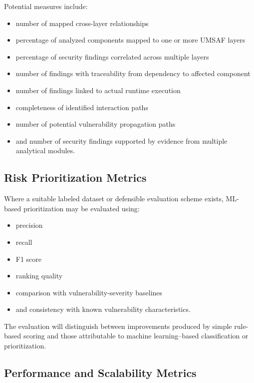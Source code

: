 \documentclass[
  12pt,
  letterpaper,
  oneside]{report}
\providecommand{\tightlist}{%
  \setlength{\itemsep}{0pt}\setlength{\parskip}{0pt}}
\begin{document}
Potential measures include:

\begin{itemize}
\tightlist
\item
  number of mapped cross-layer relationships
\item
  percentage of analyzed components mapped to one or more UMSAF layers
\item
  percentage of security findings correlated across multiple layers
\item
  number of findings with traceability from dependency to affected
  component
\item
  number of findings linked to actual runtime execution
\item
  completeness of identified interaction paths
\item
  number of potential vulnerability propagation paths
\item
  and number of security findings supported by evidence from multiple
  analytical modules.
\end{itemize}

\subsection{Risk Prioritization Metrics}\label{1157-risk-prioritization-metrics}

Where a suitable labeled dataset or defensible evaluation scheme exists,
ML-based prioritization may be evaluated using:

\begin{itemize}
\tightlist
\item
  precision
\item
  recall
\item
  F1 score
\item
  ranking quality
\item
  comparison with vulnerability-severity baselines
\item
  and consistency with known vulnerability characteristics.
\end{itemize}

The evaluation will distinguish between improvements produced by simple
rule-based scoring and those attributable to machine learning--based
classification or prioritization.

\subsection{Performance and Scalability Metrics}\label{1158-performance-and-scalability-metrics}
\end{document}
